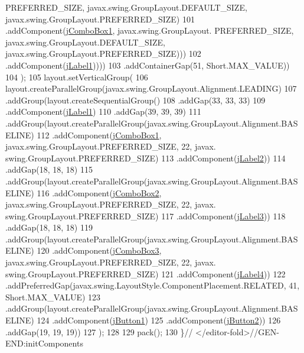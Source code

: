 \begin{DoxyCode}
      PREFERRED\_SIZE, javax.swing.GroupLayout.DEFAULT\_SIZE, javax.swing.GroupLayout.PREFERRED\_SIZE)
101                                     .addComponent(\mbox{\hyperlink{classsoftware_1_1parasoftware8_a29c30cbf2e2cc01d73b81863b7835ff4}{jComboBox1}}, javax.swing.GroupLayout.
      PREFERRED\_SIZE, javax.swing.GroupLayout.DEFAULT\_SIZE, javax.swing.GroupLayout.PREFERRED\_SIZE)))
102                             .addComponent(\mbox{\hyperlink{classsoftware_1_1parasoftware8_a0af03810fc1eb91384145459d5d48375}{jLabel1}}))))
103                 .addContainerGap(51, Short.MAX\_VALUE))
104         );
105         layout.setVerticalGroup(
106             layout.createParallelGroup(javax.swing.GroupLayout.Alignment.LEADING)
107             .addGroup(layout.createSequentialGroup()
108                 .addGap(33, 33, 33)
109                 .addComponent(\mbox{\hyperlink{classsoftware_1_1parasoftware8_a0af03810fc1eb91384145459d5d48375}{jLabel1}})
110                 .addGap(39, 39, 39)
111                 .addGroup(layout.createParallelGroup(javax.swing.GroupLayout.Alignment.BASELINE)
112                     .addComponent(\mbox{\hyperlink{classsoftware_1_1parasoftware8_a29c30cbf2e2cc01d73b81863b7835ff4}{jComboBox1}}, javax.swing.GroupLayout.PREFERRED\_SIZE, 22, javax.
      swing.GroupLayout.PREFERRED\_SIZE)
113                     .addComponent(\mbox{\hyperlink{classsoftware_1_1parasoftware8_adf24ffebf260f0020405ef0620116cbc}{jLabel2}}))
114                 .addGap(18, 18, 18)
115                 .addGroup(layout.createParallelGroup(javax.swing.GroupLayout.Alignment.BASELINE)
116                     .addComponent(\mbox{\hyperlink{classsoftware_1_1parasoftware8_a71329b43eb81e69956806597744541ab}{jComboBox2}}, javax.swing.GroupLayout.PREFERRED\_SIZE, 22, javax.
      swing.GroupLayout.PREFERRED\_SIZE)
117                     .addComponent(\mbox{\hyperlink{classsoftware_1_1parasoftware8_a4595c84142064d5890fad24684355d2a}{jLabel3}}))
118                 .addGap(18, 18, 18)
119                 .addGroup(layout.createParallelGroup(javax.swing.GroupLayout.Alignment.BASELINE)
120                     .addComponent(\mbox{\hyperlink{classsoftware_1_1parasoftware8_aa9b1b8e891179cb15751500a6d649f88}{jComboBox3}}, javax.swing.GroupLayout.PREFERRED\_SIZE, 22, javax.
      swing.GroupLayout.PREFERRED\_SIZE)
121                     .addComponent(\mbox{\hyperlink{classsoftware_1_1parasoftware8_a31d6ce76b8ed34c98cea8fb17bebb099}{jLabel4}}))
122                 .addPreferredGap(javax.swing.LayoutStyle.ComponentPlacement.RELATED, 41, Short.MAX\_VALUE)
123                 .addGroup(layout.createParallelGroup(javax.swing.GroupLayout.Alignment.BASELINE)
124                     .addComponent(\mbox{\hyperlink{classsoftware_1_1parasoftware8_a612f7c5f164dcf043b77147fdb81c9ac}{jButton1}})
125                     .addComponent(\mbox{\hyperlink{classsoftware_1_1parasoftware8_a60ca7d4c0d486e0f63581416fddf3225}{jButton2}}))
126                 .addGap(19, 19, 19))
127         );
128 
129         pack();
130     \}\textcolor{comment}{// </editor-fold>//GEN-END:initComponents}
\end{DoxyCode}
